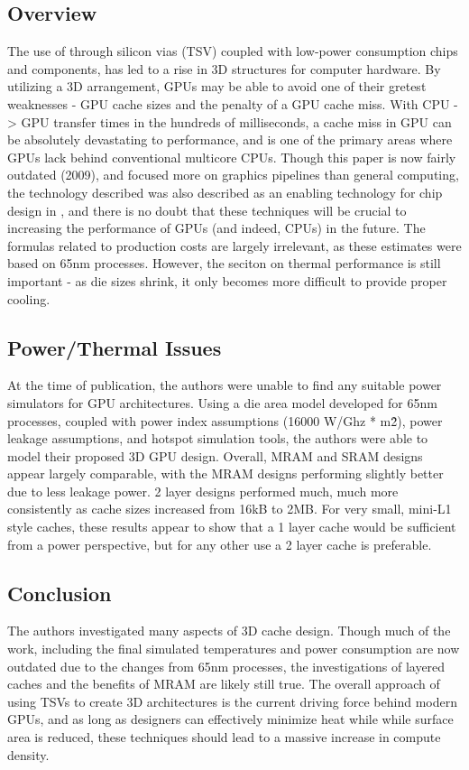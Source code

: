 \documentclass[conference]{IEEEtran}
\begin{document}
\subsection{Overview}
The use of through silicon vias (TSV) coupled with low-power consumption chips
and components, has led to a rise in 3D structures for computer hardware. By 
utilizing a 3D arrangement, GPUs may be able to avoid one of their gretest 
weaknesses - GPU cache sizes and the penalty of a GPU cache miss. With 
CPU -> GPU transfer times in the hundreds of milliseconds, a cache miss in GPU
can be absolutely devastating to performance, and is one of the primary areas
where GPUs lack behind conventional multicore CPUs. Though 
this paper is now fairly outdated \cite{cachestacking} (2009), and focused more
on graphics pipelines than general computing,
the technology described was also described as an enabling technology for
chip design in \cite{gtc}, and there is no doubt that these techniques will
be crucial to increasing the performance of GPUs (and indeed, CPUs)
in the future. The formulas related to production costs are largely irrelevant,
as these estimates were based on 65nm processes. However, the seciton on
thermal performance is still important - as die sizes shrink, it only becomes
more difficult to provide proper cooling.

\subsection{Power/Thermal Issues}
At the time of publication, the authors were unable to find any suitable power
simulators for GPU architectures. Using a die area model developed for 65nm
processes, coupled with power index assumptions (16000 W/Ghz * m\^2), power
leakage assumptions, and hotspot simulation tools, the authors were able to 
model their proposed 3D GPU design. Overall, MRAM and SRAM designs appear 
largely comparable, with the MRAM designs performing slightly better due to
less leakage power. 2 layer designs performed much, much more consistently
as cache sizes increased from 16kB to 2MB. For very small, mini-L1 style caches,
these results appear to show that a 1 layer cache would be sufficient from a 
power perspective, but for any other use a 2 layer cache is preferable.

\subsection{Conclusion}
The authors investigated many aspects of 3D cache design. Though much of the 
work, including the final simulated temperatures and power consumption are now
outdated due to the changes from 65nm processes, the investigations of layered 
caches and the benefits of MRAM are likely still true. The overall approach of 
using TSVs to create 3D architectures is the current driving force behind 
modern GPUs, and as long as designers can effectively minimize heat while 
while surface area is reduced, these techniques should lead to a massive 
increase in compute density.
\end{document}
